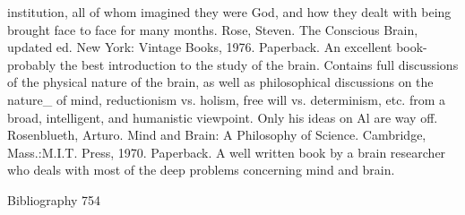   institution, all of whom imagined they were God, and how they dealt with being
  brought face to face for many months.
Rose, Steven. The Conscious Brain, updated ed. New York: Vintage Books, 1976.
Paperback. An excellent book-probably the best introduction to the study of the brain.
  Contains full discussions of the physical nature of the brain, as well as philosophical
  discussions on the nature\_ of mind, reductionism vs. holism, free will vs. determinism,
  etc. from a broad, intelligent, and humanistic viewpoint. Only his ideas on Al are way
  off.
Rosenblueth, Arturo. Mind and Brain: A Philosophy of Science. Cambridge,
  Mass.:M.I.T. Press, 1970. Paperback. A well written book by a brain researcher who
  deals with most of the deep problems concerning mind and brain.



Bibliography                                                                               754

